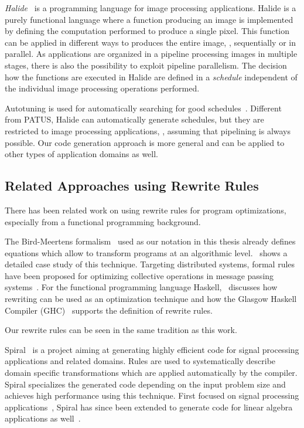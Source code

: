 \bigskip

\emph{Halide}~\cite{Ragan-KelleyAPLAD12,Ragan-KelleyBAPDA13} is a programming language for image processing applications.
Halide is a purely functional language where a function producing an image is implemented by defining the computation performed to produce a single pixel.
This function can be applied in different ways to produces the entire image, \eg, sequentially or in parallel.
As applications are organized in a pipeline processing images in multiple stages, there is also the possibility to exploit pipeline parallelism.
The decision how the functions are executed in Halide are defined in a \emph{schedule} independent of the individual image processing operations performed.

Autotuning is used for automatically searching for good schedules~\cite{Ragan-KelleyBAPDA13}.
Different from {\small PATUS}, Halide can automatically generate schedules, but they are restricted to image processing applications, \eg, assuming that pipelining is always possible.
Our code generation approach is more general and can be applied to other types of application domains as well.

\subsection{Related Approaches using Rewrite Rules}
There has been related work on using rewrite rules for program optimizations, especially from a functional programming background.

\bigskip

The Bird-Meertens formalism~\cite{Bird88} used as our notation in this thesis already defines equations which allow to transform programs at an algorithmic level.
\cite{Gorlatch96}~shows a detailed case study of this technique.
Targeting distributed systems, formal rules have been proposed for optimizing collective operations in message passing systems~\cite{GorlatchWL99,Gorlatch00,Gorlatch04}.
For the functional programming language Haskell, \cite{JonesToHo2001}~discusses how rewriting can be used as an optimization technique and how the Glasgow Haskell Compiler ({\small GHC})~\cite{HudakHJW07} supports the definition of rewrite rules.

Our rewrite rules can be seen in the same tradition as this work.

\bigskip

Spiral~\cite{PuschelMSXJPVJ04,OfenbeckRSOP13,SpampinatoP14} is a project aiming at generating highly efficient code for signal processing applications and related domains.
Rules are used to systematically describe domain specific transformations which are applied automatically by the compiler.
Spiral specializes the generated code depending on the input problem size and achieves high performance using this technique.
First focused on signal processing applications~\cite{PuschelMSXJPVJ04}, Spiral has since been extended to generate code for linear algebra applications as well~\cite{SpampinatoP14}.

